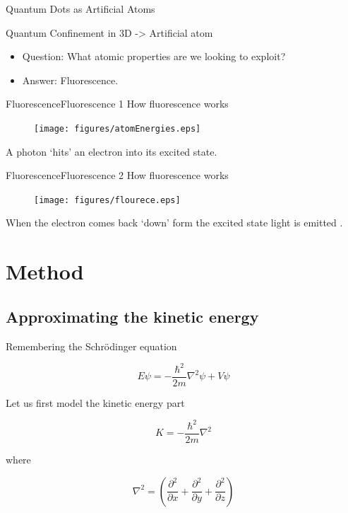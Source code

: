 \documentclass{beamer}
\begin{document}
\begin{frame}{Quantum Dots as Artificial Atoms}{}

  Quantum Confinement in 3D -> Artificial atom
  \begin{itemize}
  \item
   Question: What atomic properties are we looking to exploit?
   \pause
  \item
    Answer: Fluorescence.
  \end{itemize}
\end{frame}

\begin{frame}[fragile]{Fluorescence}{Fluorescence 1}
  How fluorescence works

\begin{figure}[h]
 \centering
 \texttt{[image: figures/atomEnergies.eps]}
\end{figure}
A photon `hits' an electron into its excited state.
\end{frame}
\begin{frame}[fragile]{Fluorescence}{Fluorescence 2}
  How fluorescence works

\begin{figure}[h]
 \centering
 \texttt{[image: figures/flourece.eps]}
\end{figure}
When the electron comes back `down' form the excited state
light is emitted \cite{qp}. 
\end{frame}


\section{Method}
\subsection{Approximating the kinetic energy}
\begin{frame}
Remembering the Schr\"{o}dinger equation

\begin{equation}
E\psi = -\frac{\hbar ^2}{2m}\nabla ^2 \psi + V\psi \nonumber
\label{eq:timeIndependent2}
\end{equation}

Let us first model the kinetic energy part

$$K = -\frac{\hbar ^2}{2m}\nabla ^2$$

where

$$
\nabla ^2 =  \left(\frac{\partial ^2}{\partial x} + \frac{\partial ^2}{\partial y} + \frac{\partial ^2}{\partial z}\right) \nonumber
$$
\end{frame}
\end{document}
